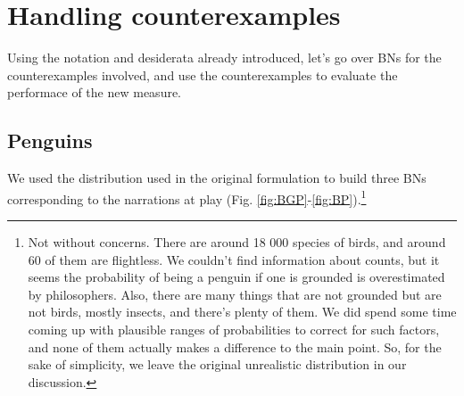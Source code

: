 \documentclass[10pt,]{scrartcl}
\begin{document}
\section{Handling counterexamples}

Using the notation and desiderata already introduced, let's go over BNs
for the counterexamples involved, and use the counterexamples to
evaluate the performace of the new measure.

\subsection{Penguins}

We used the distribution used in the original formulation to build three
BNs corresponding to the narrations at play (Fig.
\ref{fig:BGP}-\ref{fig:BP}).\footnote{Not without concerns. There are around 18 000 species of birds, and around 60 of them are flightless. We  couldn't find information about counts, but it seems the probability of being a penguin if one is grounded is overestimated by philosophers.  Also, there are many things that are not grounded but are not birds, mostly insects, and there's plenty of them. We did spend some time coming up with plausible ranges of probabilities to correct for such factors, and none of them actually makes a difference to the main point. So, for the sake of simplicity, we leave the original unrealistic distribution in our discussion.}
\end{document}
